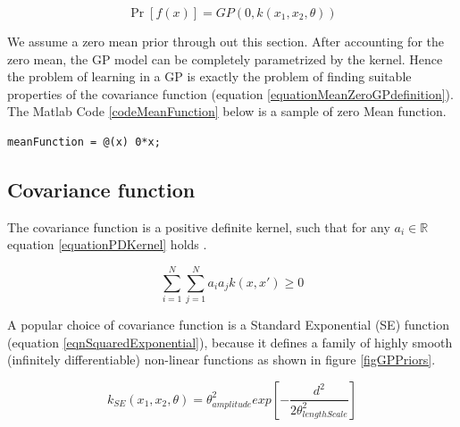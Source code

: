\begin{equation}\label{equationMeanZeroGPdefinition}
\Pr[f(x)] = GP(0 , k(x_{1}, x_{2}, \theta))
\end{equation}

We assume a zero mean prior through out this section. After accounting for the zero mean, the GP model can be completely parametrized by the kernel. Hence the problem of learning in a GP is exactly the problem of finding suitable properties of the covariance function \cite{rasmussen2006gaussian} (equation \ref{equationMeanZeroGPdefinition}). The Matlab Code \ref{codeMeanFunction} below is a sample of zero Mean function. 

\begin{mdframed}[hidealllines=true,backgroundcolor=lightgray!20]
\begin{lstlisting}[caption={A zero mean function}, 
                    captionpos=b, 
                    label={codeMeanFunction},
                    style=Matlab-editor, 
                    basicstyle=\color{black}\ttfamily\small,
                    backgroundcolor = \color{MatlabCellColour},
                   ]
% zero mean function
meanFunction = @(x) 0*x; 

\end{lstlisting}
\end{mdframed}

\subsection{Covariance function}\label{subSecCH2Covariance}
The covariance function is a positive definite kernel, such that for any $a_{i} \in \mathbb{R}$ equation \ref{equationPDKernel} holds \cite{Stein1999Springer}.

\begin{equation}\label{equationPDKernel}
\sum_{i=1}^{N}\sum_{j=1}^{N}a_{i}a_{j}k(x,x') \geq 0
\end{equation}

A popular choice of covariance function is a Standard Exponential (SE) function (equation \ref{eqnSquaredExponential}), because it defines a family of highly smooth (infinitely differentiable) non-linear functions as shown in figure \ref{figGPPriors}.

\begin{equation}\label{eqnSquaredExponential}
k_{SE}(x_{1}, x_{2}, \theta) = \theta_{amplitude}^2exp[-\frac{d^2}{2\theta_{lengthScale}^2}]
\end{equation}

